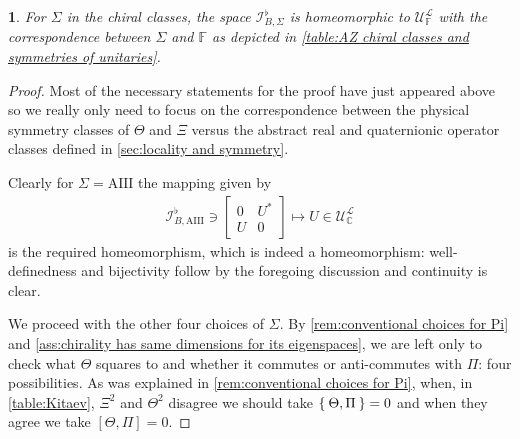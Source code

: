 \documentclass[a4paper,10pt]{article}
\numberwithin{equation}{section}
\theoremstyle{plain}
\theoremstyle{plain}
\newtheorem{lem}[thm]{\protect\lemmaname}
\theoremstyle{plain}
\theoremstyle{plain}
\theoremstyle{plain}
\theoremstyle{remark}
\theoremstyle{definition}
\theoremstyle{plain}
\providecommand{\lemmaname}{Lemma}
\newcommand{\CC}{\mathbb{C}}
\newcommand{\FF}{\mathbb{F}}
\newcommand{\calU}{\mathcal{U}}
\newcommand{\calL}{\mathcal{L}}
\newcommand{\calI}{\mathcal{I}}
\newcommand{\eql}[1]{\begin{align}#1\end{align}}
\begin{document}
	
	\begin{lem}
		For $\Sigma$ in the chiral classes, the space $\calI_{B,\Sigma}^\flat$ is homeomorphic to $\calU_\FF^\calL$ with the correspondence between $\Sigma$ and $\FF$ as depicted in \cref{table:AZ chiral classes and symmetries of unitaries}. 
	\end{lem}
	\begin{proof}
		Most of the necessary statements for the proof have just appeared above so we really only need to focus on the correspondence between the physical symmetry classes of $\Theta$ and $\Xi$ versus the abstract real and quaternionic operator classes defined in \cref{sec:locality and symmetry}.
		
		Clearly for $\Sigma=\mathrm{AIII}$ the mapping given by \eql{\label{eq:mapping insulator to unitary}\calI_{B,\mathrm{AIII}}^\flat\ni\begin{bmatrix}
				0 & U^\ast \\ U & 0 
			\end{bmatrix}\mapsto U\in\calU^\calL_\CC} is the required homeomorphism, which is indeed a homeomorphism: well-definedness and bijectivity follow by the foregoing discussion and continuity is clear.
		
		We proceed with the other four choices of $\Sigma$. By \cref{rem:conventional choices for Pi} and \cref{ass:chirality has same dimensions for its eigenspaces}, we are left only to check what $\Theta$ squares to and whether it commutes or anti-commutes with $\Pi$: four possibilities. As was explained in \cref{rem:conventional choices for Pi}, when, in \cref{table:Kitaev}, $\Xi^2$ and $\Theta^2$ disagree we should take $\Set{\Theta,\Pi}=0$ and when they agree we take $[\Theta,\Pi]=0$. 
		

\end{proof}
\end{document}
